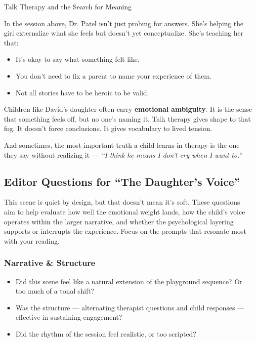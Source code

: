 \begin{PsychologicalSidebar}{Talk Therapy and the Search for Meaning}
    \medskip
    
    In the session above, Dr. Patel isn’t just probing for answers. She’s helping the girl externalize 
    what she feels but doesn’t yet conceptualize.  
    She’s teaching her that:
    
    \begin{itemize}
      \item It’s okay to say what something felt like.
      \item You don’t need to fix a parent to name your experience of them.
      \item Not all stories have to be heroic to be valid.
    \end{itemize}
    
    \medskip
    
    Children like David’s daughter often carry \textbf{emotional ambiguity}. It is the sense that 
    something feels off, but no one’s naming it. Talk therapy gives shape to that fog. It doesn’t 
    force conclusions. It gives vocabulary to lived tension.
    
    And sometimes, the most important truth a child learns in therapy is the one they say without realizing 
    it —  \textit{``I think he means I don’t cry when I want to.''}
    
\end{PsychologicalSidebar}
  
\subsection*{Editor Questions for ``The Daughter’s Voice''}

This scene is quiet by design, but that doesn't mean it's soft. These questions aim to help evaluate how well the emotional weight lands, how the child’s voice operates within the larger narrative, and whether the psychological layering supports or interrupts the experience. Focus on the prompts that resonate most with your reading.

\subsubsection*{Narrative \& Structure}

\begin{itemize}
  \item Did this scene feel like a natural extension of the playground sequence? Or too much of a tonal shift?
  \item Was the structure — alternating therapist questions and child responses — effective in sustaining engagement?
  \item Did the rhythm of the session feel realistic, or too scripted?
\end{itemize}

